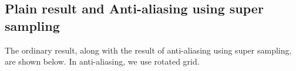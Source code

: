 \documentclass[acmtog]{acmart}
\begin{document}


\subsection{Plain result and Anti-aliasing using super sampling}

The ordinary result, along with the result of anti-aliasing using super sampling, are shown below. In anti-aliasing, we use rotated grid.

\begin{figure}[h]
	\centering
\end{figure}
\end{document}
